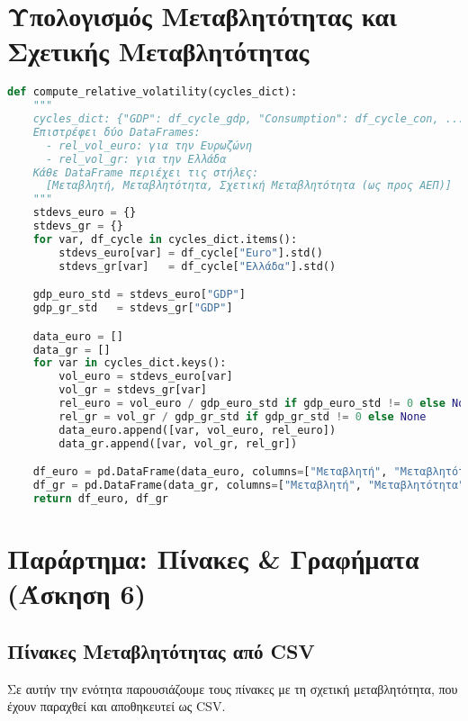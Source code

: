 \documentclass{book}
\begin{document}
\section{Υπολογισμός Μεταβλητότητας και Σχετικής Μεταβλητότητας}
\begin{tcolorbox}[colback=white,colframe=black,title=Εξαγωγή Τυπικής Απόκλισης και Σχετικής Μεταβλητότητας]
\begin{lstlisting}[language=Python]
def compute_relative_volatility(cycles_dict):
    """
    cycles_dict: {"GDP": df_cycle_gdp, "Consumption": df_cycle_con, ...}
    Επιστρέφει δύο DataFrames:
      - rel_vol_euro: για την Ευρωζώνη
      - rel_vol_gr: για την Ελλάδα
    Κάθε DataFrame περιέχει τις στήλες:
      [Μεταβλητή, Μεταβλητότητα, Σχετική Μεταβλητότητα (ως προς ΑΕΠ)]
    """
    stdevs_euro = {}
    stdevs_gr = {}
    for var, df_cycle in cycles_dict.items():
        stdevs_euro[var] = df_cycle["Euro"].std()
        stdevs_gr[var]   = df_cycle["Ελλάδα"].std()

    gdp_euro_std = stdevs_euro["GDP"]
    gdp_gr_std   = stdevs_gr["GDP"]

    data_euro = []
    data_gr = []
    for var in cycles_dict.keys():
        vol_euro = stdevs_euro[var]
        vol_gr = stdevs_gr[var]
        rel_euro = vol_euro / gdp_euro_std if gdp_euro_std != 0 else None
        rel_gr = vol_gr / gdp_gr_std if gdp_gr_std != 0 else None
        data_euro.append([var, vol_euro, rel_euro])
        data_gr.append([var, vol_gr, rel_gr])

    df_euro = pd.DataFrame(data_euro, columns=["Μεταβλητή", "Μεταβλητότητα", "Σχετική Μεταβλητότητα"])
    df_gr = pd.DataFrame(data_gr, columns=["Μεταβλητή", "Μεταβλητότητα", "Σχετική Μεταβλητότητα"])
    return df_euro, df_gr
\end{lstlisting}
\end{tcolorbox}

\section{Παράρτημα: Πίνακες \& Γραφήματα (Άσκηση 6)}

\subsection{Πίνακες Μεταβλητότητας από CSV}
Σε αυτήν την ενότητα παρουσιάζουμε τους πίνακες με τη σχετική μεταβλητότητα, που έχουν παραχθεί και αποθηκευτεί ως CSV.
\end{document}
